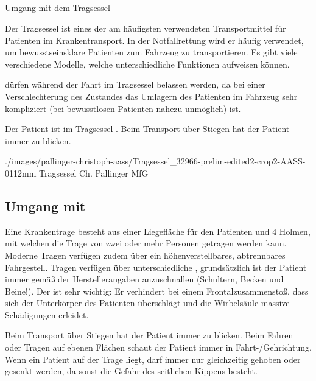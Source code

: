 \clearpage
\subsection{}



\TextSlidePicture
{Umgang mit dem Tragsessel}%
{\label{topic:tragsessel}%
Der Tragsessel ist eines der am häufigsten verwendeten
Transportmittel für Patienten im Krankentransport. In der
Notfallrettung wird er häufig verwendet, um
bewusstseinsklare Patienten zum Fahrzeug zu
transportieren. Es gibt viele verschiedene Modelle, welche
unterschiedliche Funktionen aufweisen können.

 dürfen  während der Fahrt im Tragsessel belassen
werden, da bei einer Verschlechterung des Zustandes das
Umlagern des Patienten im Fahrzeug sehr kompliziert (bei
bewusstlosen Patienten nahezu unmöglich) ist. 

Der Patient ist im Tragsessel . Beim
Transport über Stiegen hat der Patient immer  zu blicken.}%
{}%
{./images/pallinger-christoph-aass/Tragsessel_32966-prelim-edited2-crop2-AASS-0112mm}%
{Tragsessel}%
{}%
{Ch. Pallinger}%
{MfG}%




\subsection{Umgang mit }
\label{topic:fahrtrage}

\Text{\TxBeschreibung}
{%
%
%
%
%
%
%
Eine Krankentrage besteht aus einer Liegefläche für den
Patienten und 4 Holmen, mit welchen die Trage von zwei oder
mehr Personen getragen werden kann. Moderne Tragen verfügen
zudem über ein höhenverstellbares, abtrennbares Fahrgestell. 
Tragen verfügen über unterschiedliche ,
grundsätzlich ist der Patient immer gemäß der
Herstellerangaben anzuschnallen (Schultern, Becken und
Beine!). Der  ist sehr wichtig: Er verhindert
bei einem Frontalzusammenstoß, dass sich der Unterkörper des
Patienten überschlägt und die Wirbelsäule massive
Schädigungen erleidet.

Beim Transport über Stiegen hat der Patient immer
 zu blicken. Beim Fahren oder Tragen auf ebenen Flächen schaut der Patient immer in Fahrt-/Gehrichtung.
Wenn ein Patient auf der Trage liegt, darf immer nur
 gleichzeitig gehoben oder gesenkt werden,
da sonst die Gefahr des seitlichen Kippens besteht.
}{

}
{}
{}
{}

